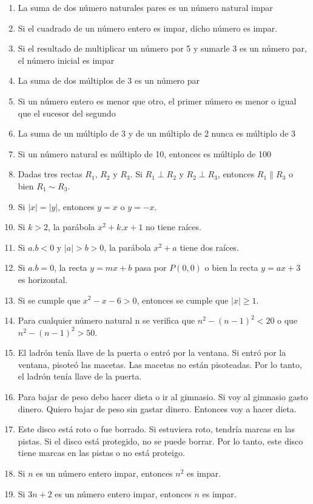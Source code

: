 \documentclass[a4paper]{article}
\begin{document}
\begin{enumerate}
\begin{enumerate} [label=(\alph*)]
		\item La suma de dos número naturales pares es un número natural impar
		\item Si el cuadrado de un número entero es impar, dicho número es impar. 
		\item Si el resultado de multiplicar un número por 5 y sumarle 3 es un número par, el número inicial es impar
		\item La suma de dos múltiplos de 3 es un número par
		\item Si un número entero es menor que otro, el primer número es menor o igual que el sucesor del segundo
		\item La suma de un múltiplo de 3 y de un múltiplo de 2 nunca es múltiplo de 3
		\item Si un número natural es múltiplo de 10, entonces es múltiplo de 100
		\item Dadas tres rectas $R_1$, $R_2$ y $R_3$. Si $R_1 \perp  R_2$ y $R_2 \perp  R_3$, entonces $R_1 \parallel  R_3$ o bien $R_1 \sim R_3$.
		\item Si $|x| = |y|$, entonces  $y=x$ o $y=-x$.
		\item Si $k>2$, la parábola $x^2+k.x+1$ no tiene raíces.
		\item Si $a.b < 0$ y $|a|>b>0$, la parábola $x^2+a$ tiene dos raíces.
		\item Si $a.b = 0$, la recta $y=mx+b$ pasa por $P(0,0)$ o bien la recta $y=ax+3$ es horizontal.
		\item Si se cumple que $x^2-x-6>0$, entonces se cumple que $|x|\geq 1$.
		\item Para cualquier número natural n se verifica que $n^2 - (n-1)^2 < 20$  o que  $n^2 - (n-1)^2 >50$.
		\item El ladrón tenía llave de la puerta o entró por la ventana. Si entró por la ventana, pisoteó las macetas. Las macetas no están pisoteadas. Por lo tanto, el ladrón tenía llave de la puerta.
		\item Para bajar de peso debo hacer dieta o ir al gimnasio. Si voy al gimnasio gasto dinero. Quiero bajar de peso sin gastar dinero. Entonces voy a hacer dieta. 
		\item Este disco está roto o fue borrado. Si estuviera roto, tendría marcas en las pistas. Si el disco está protegido, no se puede borrar. Por lo tanto, este disco tiene marcas en las pistas o no está proteigo.
		\item Si $n$ es un número entero impar, entonces $n^2$ es impar.
		\item Si $3n+2$ es un número entero impar, entonces $n$ es impar.

\end{enumerate}
\end{enumerate}
\end{document}

